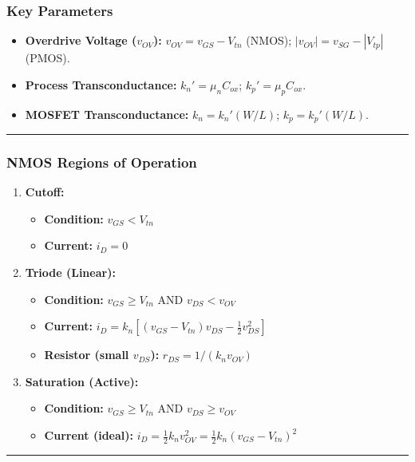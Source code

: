 \documentclass[10pt, letterpaper]{article}
\begin{document}
\subsubsection*{Key Parameters}
\begin{itemize}
    \item \textbf{Overdrive Voltage ($v_{OV}$):} $v_{OV} = v_{GS} - V_{tn}$ (NMOS); $|v_{OV}| = v_{SG} - |V_{tp}|$ (PMOS).
    \item \textbf{Process Transconductance:} $k_n' = \mu_n C_{ox}$; $k_p' = \mu_p C_{ox}$.
    \item \textbf{MOSFET Transconductance:} $k_n = k_n' (W/L)$; $k_p = k_p' (W/L)$.
\end{itemize}

\hrule

\subsubsection*{NMOS Regions of Operation}
\begin{enumerate}
    \item \textbf{Cutoff:}
    \begin{itemize}
        \item \textbf{Condition:} $v_{GS} < V_{tn}$
        \item \textbf{Current:} $i_D = 0$
    \end{itemize}
    \item \textbf{Triode (Linear):}
    \begin{itemize}
        \item \textbf{Condition:} $v_{GS} \ge V_{tn}$ AND $v_{DS} < v_{OV}$
        \item \textbf{Current:} $i_D = k_n \left[ (v_{GS} - V_{tn}) v_{DS} - \frac{1}{2} v_{DS}^2 \right]$
        \item \textbf{Resistor (small $v_{DS}$):} $r_{DS} = 1 / (k_n v_{OV})$
    \end{itemize}
    \item \textbf{Saturation (Active):}
    \begin{itemize}
        \item \textbf{Condition:} $v_{GS} \ge V_{tn}$ AND $v_{DS} \ge v_{OV}$
        \item \textbf{Current (ideal):} $i_D = \frac{1}{2} k_n v_{OV}^2 = \frac{1}{2} k_n (v_{GS} - V_{tn})^2$
    \end{itemize}
\end{enumerate}

\hrule
\end{document}
